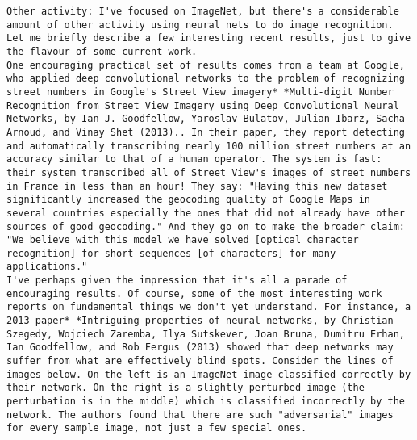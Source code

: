 \begin{lstlisting}
Other activity: I've focused on ImageNet, but there's a considerable amount of other activity using neural nets to do image recognition. Let me briefly describe a few interesting recent results, just to give the flavour of some current work.
One encouraging practical set of results comes from a team at Google, who applied deep convolutional networks to the problem of recognizing street numbers in Google's Street View imagery* *Multi-digit Number Recognition from Street View Imagery using Deep Convolutional Neural Networks, by Ian J. Goodfellow, Yaroslav Bulatov, Julian Ibarz, Sacha Arnoud, and Vinay Shet (2013).. In their paper, they report detecting and automatically transcribing nearly 100 million street numbers at an accuracy similar to that of a human operator. The system is fast: their system transcribed all of Street View's images of street numbers in France in less than an hour! They say: "Having this new dataset significantly increased the geocoding quality of Google Maps in several countries especially the ones that did not already have other sources of good geocoding." And they go on to make the broader claim: "We believe with this model we have solved [optical character recognition] for short sequences [of characters] for many applications."
I've perhaps given the impression that it's all a parade of encouraging results. Of course, some of the most interesting work reports on fundamental things we don't yet understand. For instance, a 2013 paper* *Intriguing properties of neural networks, by Christian Szegedy, Wojciech Zaremba, Ilya Sutskever, Joan Bruna, Dumitru Erhan, Ian Goodfellow, and Rob Fergus (2013) showed that deep networks may suffer from what are effectively blind spots. Consider the lines of images below. On the left is an ImageNet image classified correctly by their network. On the right is a slightly perturbed image (the perturbation is in the middle) which is classified incorrectly by the network. The authors found that there are such "adversarial" images for every sample image, not just a few special ones.


\end{lstlisting}
